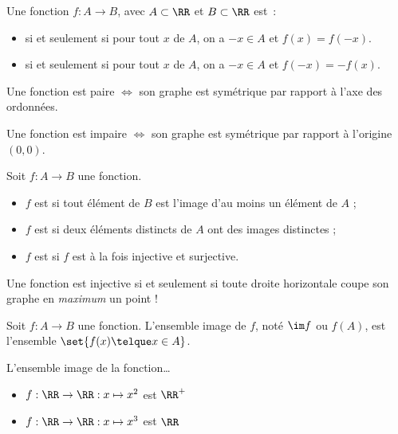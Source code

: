 \documentclass[french,xcolor=svgnames]{beamer}
\begin{document}
\begin{frame}
  \begin{definition}
    Une fonction $f \colon A \to B$, avec $A \subset \RR$ et $B \subset \RR$ est~:\pause{}
    \begin{itemize}
    \item {}\pause{} si et seulement si pour tout $x$ de $A$,\pause{} on a $-x \in A$ et $f(x) = f(-x)$.
    \item {}\pause{} si et seulement si pour tout $x$ de $A$,\pause{} on a $-x \in A$ et $f(-x) = -f(x)$.
    \end{itemize}
  \end{definition}
  \begin{remark*}\pause{}
    Une fonction est paire \(\iff\)\pause{} son graphe est symétrique par rapport à l'axe des ordonnées.\pause{}

    Une fonction est impaire \(\iff\)\pause{} son graphe est symétrique par rapport à l'origine $(0,0)$.
  \end{remark*}
\end{frame}
\begin{frame}
  Soit $f : A \to B$ une fonction.\pause{}
  \begin{itemize}
  \item $f$ est  si\pause{} tout élément de $B$ est l'image d'au moins un élément de $A$ ;\pause{}
  \item $f$ est  si\pause{} deux éléments distincts de $A$ ont des images distinctes ;\pause{}
  \item $f$ est  si\pause{} $f$ est à la fois injective et surjective.
  \end{itemize}\pause

  \begin{remark}
    Une fonction est injective si et seulement si\pause{} toute droite horizontale coupe son graphe en \emph{maximum} un point !
  \end{remark}
\end{frame}

\begin{frame}
  Soit \(f : A \to B\) une fonction.\pause{}
  L'ensemble image de \(f\), noté \(\im f\) ou \(f(A)\), est l'ensemble \(\set{f(x) \telque x \in A}\).\pause{}

  L'ensemble image de la fonction\dots\pause{}
  \begin{itemize}
  \item \(f : \RR \to \RR : x \mapsto x^{2}\) est\pause{} \(\RR^+\)\pause
  \item \(f : \RR \to \RR : x \mapsto x^{3}\) est\pause{} \(\RR\)
  \end{itemize}
\end{frame}
\end{document}
